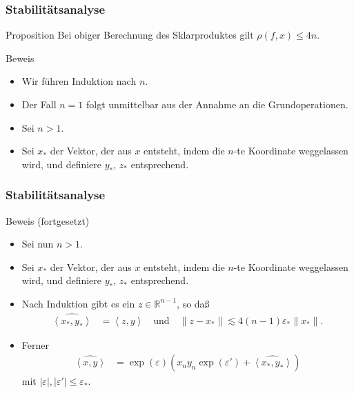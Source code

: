 \documentclass{beamer}
\newcommand\RR{\mathbb R}
\newcommand{\eps}{\varepsilon}
\newcommand{\bck}[1]{\left\langle{#1}\right\rangle}
\newcommand\scal[2]{\bck{{#1},{#2}}}
\renewcommand{\ae}{\"a}
\newcommand{\mytitle}{Stabilit\ae tsanalyse}
\begin{document}
\begin{frame}\frametitle{\mytitle}
	\begin{block}{Proposition}
Bei obiger Berechnung des Sklarproduktes gilt $\rho(f,x)\leq 4n$.
	\end{block}
	\begin{block}{Beweis}
	\begin{itemize}
	\item Wir f\"uhren Induktion nach $n$.
\item Der Fall $n=1$ folgt unmittelbar aus der Annahme an die Grundoperationen.
\item Sei $n>1$.
\item Sei $x_*$ der Vektor, der aus $x$ entsteht, indem die $n$-te Koordinate weggelassen wird, und definiere $y_*$, $z_*$ entsprechend.
	\end{itemize}	
	\end{block}
\end{frame}

\begin{frame}\frametitle{\mytitle}
	\begin{block}{Beweis (fortgesetzt)}
		\begin{itemize}
			\item Sei nun $n>1$.
			\item Sei $x_*$ der Vektor, der aus $x$ entsteht, indem die $n$-te Koordinate weggelassen wird, und definiere $y_*$, $z_*$ entsprechend.
			\item Nach Induktion gibt es ein $z\in\RR^{n-1}$, so da\ss
				\begin{align*}
					\widehat{\scal{x_*}{y_*} }&=\scal zy\quad\mbox{und}\quad\|z-x_*\|\lesssim4(n-1)\eps_*\|x_*\|.
				\end{align*}
			\item Ferner 
				\begin{align*}
					\widehat{\scal{x}{y} }&=\exp(\eps)(x_ny_n\exp(\eps')+\widehat{\scal{x_*}{y_*} })
				\end{align*}
				mit $|\eps|,|\eps'|\leq\eps_*$.
		\end{itemize}
	\end{block}
\end{frame}
\end{document}
